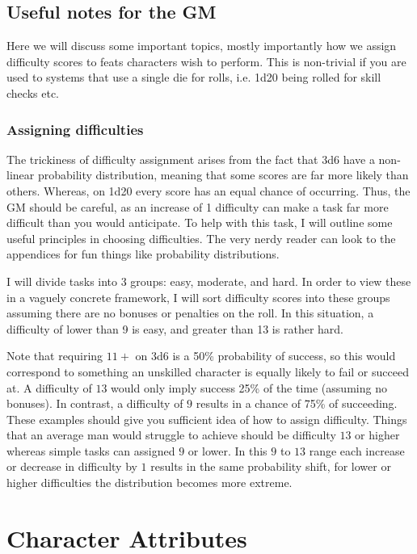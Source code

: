 \documentclass[a4paper,10pt,oneside]{book}
\begin{document}
\section{Useful notes for the GM}
Here we will discuss some important topics, mostly importantly how we assign difficulty scores to feats characters wish to perform. This is non-trivial if you are used to systems that use a single die for rolls, i.e. 1d20 being rolled for skill checks etc. 

\subsection{Assigning difficulties}
The trickiness of difficulty assignment arises from the fact that 3d6 have a non-linear probability distribution, meaning that some scores are far more likely than others. Whereas, on 1d20 every score has an equal chance of occurring. Thus, the GM should be careful, as an increase of 1 difficulty can make a task far more difficult than you would anticipate. To help with this task, I will outline some useful principles in choosing difficulties. The very nerdy reader can look to the appendices for fun things like probability distributions. 

I will divide tasks into 3 groups: easy, moderate, and hard. In order to view these in a vaguely concrete framework, I will sort difficulty scores into these groups assuming there are no bonuses or penalties on the roll. In this situation, a difficulty of lower than 9 is easy, and greater than 13 is rather hard. 

Note that requiring $11+$ on 3d6 is a 50\% probability of success, so this would correspond to something an unskilled character is equally likely to fail or succeed at. A difficulty of $13$ would only imply success 25\% of the time (assuming no bonuses). In contrast, a difficulty of $9$ results in a chance of 75\% of succeeding. These examples should give you sufficient idea of how to assign difficulty. Things that an average man would struggle to achieve should be difficulty $13$ or higher whereas simple tasks can assigned $9$ or lower. In this $9$ to $13$ range each increase or decrease in difficulty by $1$ results in the same probability shift, for lower or higher difficulties the distribution becomes more extreme.




\chapter{Character Attributes}
\label{chap:attb}
\end{document}
